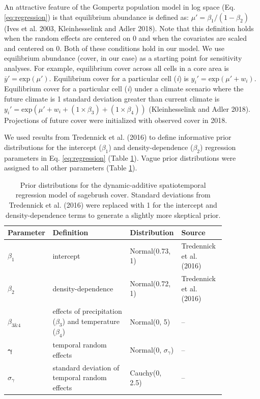 \documentclass[
  12pt,
]{article}
\begin{document}
An attractive feature of the Gompertz population model in log space (Eq. \ref{eq:regression}) is that equilibrium abundance is defined as: \(\mu' = \beta_1 / \left(1 - \beta_2 \right)\) (Ives et al. 2003, Kleinhesselink and Adler 2018).
Note that this definition holds when the random effects are centered on 0 and when the covariates are scaled and centered on 0.
Both of these conditions hold in our model.
We use equilibrium abundance (cover, in our case) as a starting point for sensitivity analyses.
For example, equilibrium cover across all cells in a core area is \(\overline{y}' = \text{exp}(\mu')\).
Equilibrium cover for a particular cell (\emph{i}) is \(y_i' = \text{exp}(\mu' + w_i)\).
Equilibrium cover for a particular cell (\emph{i}) under a climate scenario where the future climate is 1 standard deviation greater than current climate is \(y_i' = \text{exp}\left(\mu' + w_i + (1\times\beta_3) + (1\times\beta_4) \right)\) (Kleinhesselink and Adler 2018).
Projections of future cover were initialized with observed cover in 2018.

We used results from Tredennick et al. (2016) to define informative prior distributions for the intercept (\(\beta_1\)) and density-dependence (\(\beta_2\)) regression parameters in Eq. \ref{eq:regression} (Table \ref{tab:priors}).
Vague prior distributions were assigned to all other parameters (Table \ref{tab:priors}).

\begin{table}[tbp]
\caption{\label{tab:priors}Prior distributions for the dynamic-additive spatiotemporal regression model of sagebrush cover. Standard deviations from Tredennick et al. (2016) were replaced with 1 for the intercept and density-dependence terms to generate a slightly more skeptical prior.}
\small
\begin{tabular}{p{0.1\linewidth}p{0.35\linewidth}p{0.2\linewidth}p{0.2\linewidth}}
\hline
Parameter & Definition & Distribution & Source \\ \hline
$\beta_1$ & intercept  & Normal(0.73, 1) & Tredennick et al. (2016) \\
$\beta_2$ & density-dependence & Normal(0.72, 1) & Tredennick et al. (2016) \\
$\beta_{3\&4}$ & effects of precipitation ($\beta_3$) and temperature ($\beta_4$) & Normal(0, 5) & --  \\ 
$\bm{\gamma}$ & temporal random effects & Normal(0, $\sigma_{\gamma}$) & -- \\
$\sigma_{\gamma}$ & standard deviation of temporal random effects & Cauchy(0, 2.5) & -- \\ \hline
\end{tabular}
\end{table}
\end{document}
